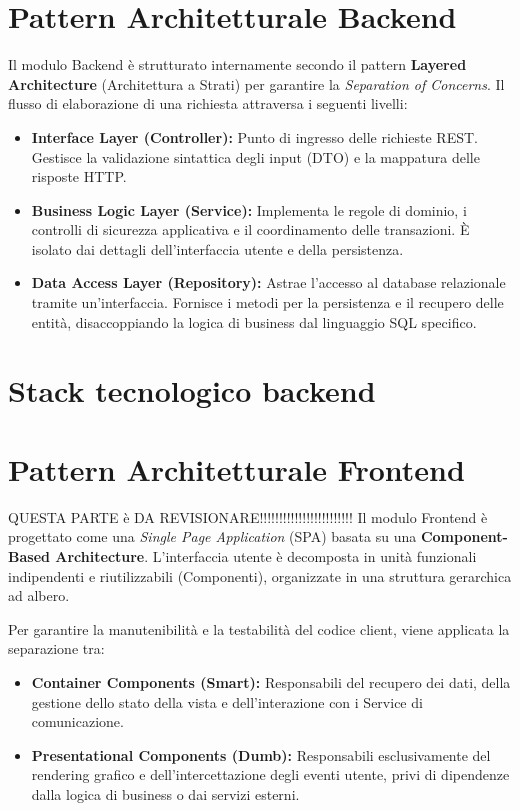 \section{Pattern Architetturale Backend}
Il modulo Backend è strutturato internamente secondo il pattern \textbf{Layered Architecture} (Architettura a Strati) per garantire la \textit{Separation of Concerns}. Il flusso di elaborazione di una richiesta attraversa i seguenti livelli:

\begin{itemize}
    \item \textbf{Interface Layer (Controller):} Punto di ingresso delle richieste REST. Gestisce la validazione sintattica degli input (DTO) e la mappatura delle risposte HTTP.
    \item \textbf{Business Logic Layer (Service):} Implementa le regole di dominio, i controlli di sicurezza applicativa e il coordinamento delle transazioni. È isolato dai dettagli dell'interfaccia utente e della persistenza.
    \item \textbf{Data Access Layer (Repository):} Astrae l'accesso al database relazionale tramite un'interfaccia. Fornisce i metodi per la persistenza e il recupero delle entità, disaccoppiando la logica di business dal linguaggio SQL specifico.
\end{itemize}


\section{Stack tecnologico backend}



\section{Pattern Architetturale Frontend}
QUESTA PARTE è DA REVISIONARE!!!!!!!!!!!!!!!!!!!!!!!!
Il modulo Frontend è progettato come una \textit{Single Page Application} (SPA) basata su una \textbf{Component-Based Architecture}. L'interfaccia utente è decomposta in unità funzionali indipendenti e riutilizzabili (Componenti), organizzate in una struttura gerarchica ad albero.

Per garantire la manutenibilità e la testabilità del codice client, viene applicata la separazione tra:
\begin{itemize}
    \item \textbf{Container Components (Smart):} Responsabili del recupero dei dati, della gestione dello stato della vista e dell'interazione con i Service di comunicazione.
    \item \textbf{Presentational Components (Dumb):} Responsabili esclusivamente del rendering grafico e dell'intercettazione degli eventi utente, privi di dipendenze dalla logica di business o dai servizi esterni.
\end{itemize}

